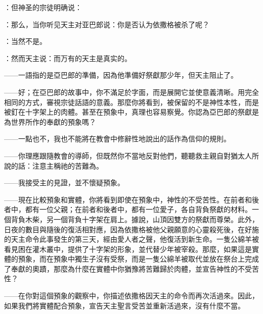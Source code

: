 ：但神圣的宗徒明确说：\par

：那么，当你听见天主对亚巴郎说：你是否认为依撒格被杀了呢？\par

：当然不是。\par

：然而天主说：而万有的天主是真实的。\par

——一語指的是亞巴郎的準備，因為他準備好祭獻那少年，但天主阻止了。\par

——好；在亞巴郎的故事中，你不滿足於字面，而是展開它並使意義清晰。用完全相同的方式，審視宗徒話語的意義。那麼你將看到，被保留的不是神性本性，而是被釘在十字架上的肉體。甚至在預象中，真理也容易察覺。你認為亞巴郎的祭獻是為世界所作的奉獻的預象嗎？\par

——一點也不，我也不能將在教會中修辭性地說出的話作為信仰的規則。\par

——你理應跟隨教會的導師，但既然你不當地反對他們，聽聽救主親自對猶太人所說的話：注意主稱祂的苦難為。\par

——我接受主的見證，並不懷疑預象。\par

——現在比較預象和實體，你將看到即使在預象中，神性的不受苦性。在前者和後者中，都有一位父親；在前者和後者中，都有一位愛子，各自背負祭獻的材料。一個背負木柴，另一個背負十字架在肩上。據說，山頂因雙方的祭獻而尊榮。此外，日夜的數目與隨後的復活相對應，因為依撒格被他父親願意的心靈殺死後，在好施的天主命令此事發生的第三天，經由愛人者之聲，他復活到新生命。一隻公綿羊被看見困在灌木叢中，提供了十字架的形象，並代替少年被宰殺。那麼，如果這是實體的預象，而在預象中獨生子沒有受祭，而是一隻公綿羊被取代並放在祭台上完成了奉獻的奧蹟，那麼為什麼在實體中你猶豫將苦難歸於肉體，並宣告神性的不受苦性？\par

——在你對這個預象的觀察中，你描述依撒格因天主的命令而再次活過來。因此，如果我們將實體配合預象，宣告天主聖言受苦並重新活過來，沒有什麼不當。\par

